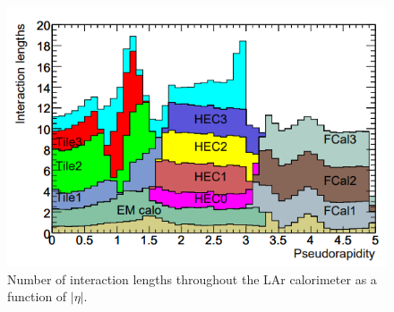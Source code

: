 \begin{figure}[ht!]
	\centering
	\includegraphics[width=0.8\columnwidth]{../ThesisImages/LHCImages/InteractionLengths.png}
	\caption[Number of interaction lengths throughout the LAr calorimeter as a function of $|\eta|$.]{Number of interaction lengths throughout the LAr calorimeter as a function of $|\eta|$.
	}
	\label{fig:InteractionLengths}
\end{figure}


